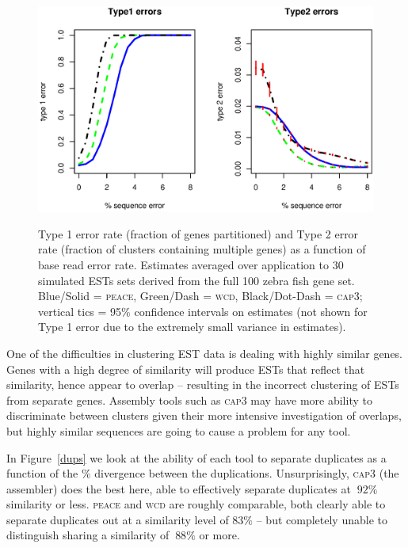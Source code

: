 \documentclass[a4paper,12pt]{article}
\begin{document}
\begin{appendix}
\begin{figure}[tbp]
\centerline{\includegraphics[scale=0.5]{t1t2.eps}
\label{t1t2}
}
\caption{Type 1 error rate (fraction of genes partitioned) and Type 2
  error rate (fraction of clusters containing multiple genes) as a
  function of base read error rate.  Estimates averaged over
  application to 30 simulated ESTs sets derived from the full 100
  zebra fish gene set. Blue/Solid = \textsc{peace}, Green/Dash =
  \textsc{wcd}, Black/Dot-Dash = \textsc{cap3}; vertical tics = 95\%
  confidence intervals on estimates (not shown for Type 1 error due to
  the extremely small variance in estimates).}
\end{figure}

One of the difficulties in clustering EST data is dealing with
highly similar genes.  Genes with a high degree of similarity will
produce ESTs that reflect that similarity, hence appear to overlap --
resulting in the incorrect clustering of ESTs from separate genes.  Assembly tools
such as \textsc{cap3} may have more ability to discriminate between clusters
given their more intensive investigation of overlaps, but highly
similar sequences are going to cause a problem for any tool. 

In Figure~\ref{dups} we look at the ability of each tool to separate
duplicates as a function of the \% divergence between the
duplications.  Unsurprisingly, \textsc{cap3} (the assembler) does the best
here, able to effectively separate duplicates at $~92\%$ similarity
or less.  \textsc{peace} and \textsc{wcd} are roughly comparable, both clearly able to
separate duplicates out at a similarity level of $83\%$ -- but completely 
unable to distinguish sharing a similarity of $~88\%$ or more. 


\end{appendix}
\end{document}
